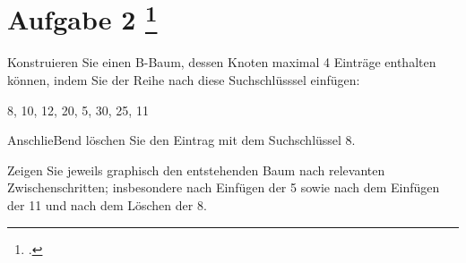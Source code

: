 \documentclass{lehramt-informatik-aufgabe}
\begin{document}
\section{Aufgabe 2
\footcite{66116:2017:03}}

Konstruieren Sie einen B-Baum, dessen Knoten maximal 4 Einträge
enthalten können, indem Sie der Reihe nach diese Suchschlüsssel
einfügen:

8, 10, 12, 20, 5, 30, 25, 11

AnschlieBend löschen Sie den Eintrag mit dem Suchschlüssel 8.

Zeigen Sie jeweils graphisch den entstehenden Baum nach relevanten
Zwischenschritten; insbesondere nach Einfügen der 5 sowie nach dem
Einfügen der 11 und nach dem Löschen der 8.
\end{document}
